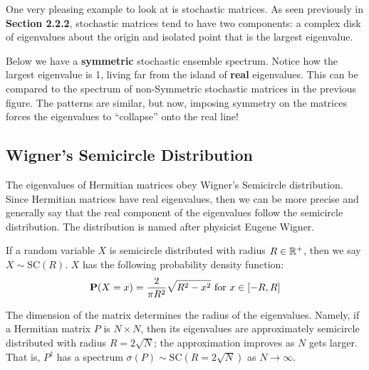 
One very pleasing example to look at is stochastic matrices.
As seen previously in \textbf{Section 2.2.2}, stochastic matrices tend to have two components: a complex disk of eigenvalues about the origin and isolated point that is the largest eigenvalue.

Below we have a \textbf{symmetric} stochastic ensemble spectrum. Notice how the largest eigenvalue is 1, living far from the island of \textbf{real} eigenvalues.
This can be compared to the spectrum of non-Symmetric stochastic matrices in the previous figure.
The patterns are similar, but now, imposing symmetry on the matrices forces the eigenvalues to ``collapse'' onto the real line!


\newpage
\subsection{Wigner's Semicircle Distribution}

The eigenvalues of Hermitian matrices obey Wigner's Semicircle distribution.
Since Hermitian matrices have real eigenvalues, then we can be more precise and generally say that the real component of the eigenvalues follow the semicircle distribution.
The distribution is named after physicist Eugene Wigner.

\begin{definition}
If a random variable $X$ is semicircle distributed with radius $R \in \mathbb{R}^+$, then we say $X \sim \text{SC}(R)$. $X$ has the following probability density function:
$$\textbf{P}(X = x) = \frac{2}{\pi R^2} \sqrt{R^2 - x^2} \text{ for } x \in [-R, R]$$
\end{definition}

\begin{remark}
The dimension of the matrix determines the radius of the eigenvalues.
Namely, if a Hermitian matrix $P$ is $N \times N$, then its eigenvalues are approximately semicircle distributed with radius $R = 2\sqrt{N}$; the approximation improves as $N$ gets larger.
That is, $P^{\dagger}$ has a spectrum $\sigma({P}) \sim \text{SC}(R = 2\sqrt{N})$ as $N \to \infty$.
\end{remark}

